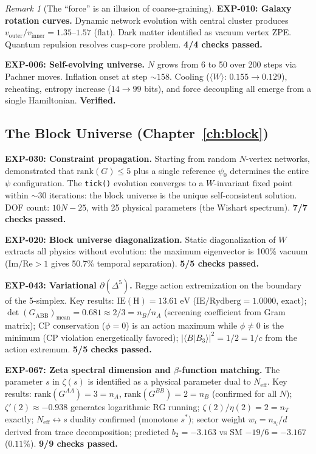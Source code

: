 \documentclass[12pt]{article}
\theoremstyle{remark}
\newtheorem{remark}[theorem]{Remark}
\theoremstyle{definition}
\begin{document}
\begin{remark}[The ``force'' is an illusion of coarse-graining]
\textbf{EXP-010: Galaxy rotation curves.} Dynamic network evolution with central cluster produces $v_\text{outer}/v_\text{inner} = 1.35$--$1.57$ (flat). Dark matter identified as vacuum vertex ZPE. Quantum repulsion resolves cusp-core problem. \textbf{4/4 checks passed.}

\textbf{EXP-006: Self-evolving universe.} $N$ grows from 6 to 50 over 200 steps via Pachner moves. Inflation onset at step $\sim 158$. Cooling ($\langle W\rangle$: $0.155 \to 0.129$), reheating, entropy increase ($14 \to 99$ bits), and force decoupling all emerge from a single Hamiltonian. \textbf{Verified.}

\subsection{The Block Universe (Chapter~\ref{ch:block})}

\textbf{EXP-030: Constraint propagation.} Starting from random $N$-vertex networks, demonstrated that $\text{rank}(G) \leq 5$ plus a single reference $\psi_0$ determines the entire $\psi$ configuration. The \texttt{tick()} evolution converges to a $W$-invariant fixed point within $\sim 30$ iterations: the block universe is the unique self-consistent solution. DOF count: $10N - 25$, with 25 physical parameters (the Wishart spectrum). \textbf{7/7 checks passed.}

\textbf{EXP-020: Block universe diagonalization.} Static diagonalization of $W$ extracts all physics without evolution: the maximum eigenvector is 100\% vacuum ($\text{Im}/\text{Re} > 1$ gives 50.7\% temporal separation). \textbf{5/5 checks passed.}

\textbf{EXP-043: Variational $\partial(\Delta^5)$.}  Regge action extremization on the boundary of the 5-simplex. Key results: $\text{IE}(\text{H}) = 13.61\;\text{eV}$ ($\text{IE}/\text{Rydberg} = 1.0000$, exact); $\det(G_\text{ABB})_\text{mean} = 0.681 \approx 2/3 = n_B/n_A$ (screening coefficient from Gram matrix); CP conservation ($\phi = 0$) is an action maximum while $\phi \neq 0$ is the minimum (CP violation energetically favored); $|\langle B|B_3\rangle|^2 = 1/2 = 1/c$ from the action extremum. \textbf{5/5 checks passed.}

\textbf{EXP-067: Zeta spectral dimension and $\beta$-function matching.}  The parameter $s$ in $\zeta(s)$ is identified as a physical parameter dual to $N_\text{eff}$. Key results: $\text{rank}(G^{AA}) = 3 = n_A$, $\text{rank}(G^{BB}) = 2 = n_B$ (confirmed for all $N$); $\zeta'(2) \approx -0.938$ generates logarithmic RG running; $\zeta(2)/\eta(2) = 2 = n_T$ exactly; $N_\text{eff} \leftrightarrow s$ duality confirmed (monotone $s^*$); sector weight $w_i = n_{s_i}/d$ derived from trace decomposition; predicted $b_2 = -3.163$ vs SM $-19/6 = -3.167$ ($0.11\%$). \textbf{9/9 checks passed.}


\end{remark}
\end{document}

